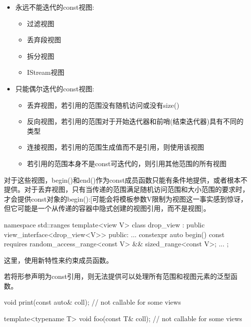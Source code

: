 \begin{itemize}
\item
永远不能迭代的const视图:

\begin{itemize}
\item
过滤视图

\item
丢弃段视图

\item
拆分视图

\item
IStream视图
\end{itemize}

\item
只能偶尔迭代的const视图:

\begin{itemize}
\item
丢弃视图，若引用的范围没有随机访问或没有size()

\item
反向视图，若引用的范围对于开始迭代器和前哨(结束迭代器)具有不同的类型

\item
连接视图，若引用的范围生成值而不是引用，则使用该视图

\item
若引用的范围本身不是const可迭代的，则引用其他范围的所有视图
\end{itemize}
\end{itemize}

对于这些视图，begin()和end()作为const成员函数只能有条件地提供，或者根本不提供。对于丢弃视图，只有当传递的范围满足随机访问范围和大小范围的要求时，才会提供const对象的begin():[可能会将模板参数V限制为视图这一事实感到惊讶，但它可能是一个从传递的容器中隐式创建的视图引用，而不是视图]。


\begin{cpp}
namespace std::ranges {
	template<view V>
	class drop_view : public view_interface<drop_view<V>> {
		public:
		...
		constexpr auto begin() const requires random_access_range<const V>
		&& sized_range<const V>;
		...
	};
}
\end{cpp}

这里，使用新特性来约束成员函数。

若将形参声明为const引用，则无法提供可以处理所有范围和视图元素的泛型函数。

\begin{cpp}
void print(const auto& coll); // not callable for some views

template<typename T>
void foo(const T& coll); // not callable for some views
\end{cpp}

